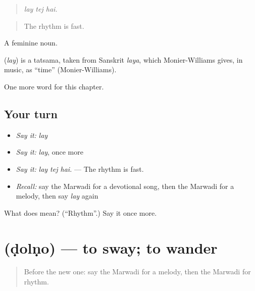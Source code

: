 \begin{quote}
  
\end{quote}

\begin{quote}
\emph{lay tej hai.}
\end{quote}

\begin{quote}
The rhythm is fast.
\end{quote}

A feminine noun.

\begin{cousinweb}
\textbf{} (\emph{lay}) is a tatsama, taken from Sanskrit \emph{laya}, which Monier-Williams gives, in music, as \textquotedblleft{}time\textquotedblright{} (Monier-Williams).
\end{cousinweb}

\begin{grammarlens}[title={What you've built}]
One more word for this chapter.
\end{grammarlens}

\subsection*{Your turn}
\begin{itemize}
\raggedright
  \item \emph{Say it:} \emph{lay}
  \item \emph{Say it:} \emph{lay}, once more
  \item \emph{Say it:} \emph{lay tej hai.} — The rhythm is fast.
  \item \emph{Recall:} say the Marwadi for a devotional song, then the Marwadi for a melody, then say \emph{lay} again
\end{itemize}

\begin{tcolorbox}[breakable,colback=teal!4,colframe=teal!35!black,title={Before you move on}]
What does  mean? (\textquotedblleft{}Rhythm\textquotedblright{}.) Say it once more.
\end{tcolorbox}
\section[\texorpdfstring{\mw{डोलणो} (ḍolṇo)}{डोलणो (ḍolṇo)}]{ (ḍolṇo) — to sway; to wander}

\label{lesson:MW-C277-dolno}



\begin{quote}
Before the new one: say the Marwadi for a melody, then the Marwadi for rhythm.
\end{quote}

